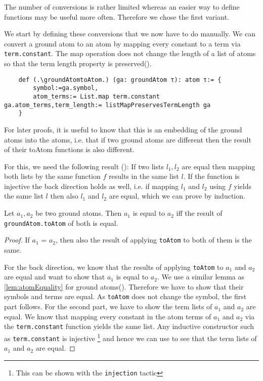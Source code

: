 The number of conversions is rather limited whereas an easier way to define functions may be useful more often. Therefore we chose the first variant. 

We start by defining these conversions that we now have to do manually. We can convert a ground atom to an atom by mapping every constant to a term via \lstinline|term.constant|. The map operation does not change the length of a list of atoms so that the term length property is preserved(\listMapPreservesTermLength).

\begin{lstlisting}
    def (.\groundAtomtoAtom.) (ga: groundAtom τ): atom τ:= {
        symbol:=ga.symbol, 
        atom_terms:= List.map term.constant ga.atom_terms,term_length:= listMapPreservesTermLength ga
    }
\end{lstlisting}

For later proofs, it is useful to know that this is an embedding of the ground atoms into the atoms, i.e. that if two ground atoms are different then the result of their toAtom functions is also different.

For this, we need the following result (\listMapInjectiveEquality): If two lists $l_1, l_2$ are equal then mapping both lists by the same function $f$ results in the same list $l$. If the function is injective the back direction holds as well, i.e. if mapping $l_1$ and $l_2$ using $f$ yields the same list $l$ then also $l_1$ and $l_2$ are equal,  which we can prove by induction.

\begin{lemma}[\groundAtomToAtomEquality]
    Let $a_1, a_2$ be two ground atoms. Then $a_1$ is equal to $a_2$ iff the result of \lstinline|groundAtom.toAtom| of both is equal.
\end{lemma}
\begin{proof}
    If $a_1$ = $a_2$, then also the result of applying \lstinline|toAtom| to both of them is the same.

    For the back direction, we know that the results of applying \lstinline|toAtom| to $a_1$ and $a_2$ are equal and want to show that $a_1$ is equal to $a_2$. We use a similar lemma as \cref{lem:atomEquality} for ground atoms(\groundAtomEquality). Therefore we have to show that their symbols and terms are equal. As \lstinline|toAtom| does not change the symbol, the first part follows. For the second part, we have to show the term lists of $a_1$ and $a_2$ are equal. We know that mapping every constant in the atom terms of $a_1$ and $a_2$  via the \lstinline|term.constant| function yields the same list. Any inductive constructor such as \lstinline|term.constant| is injective \footnote{This can be shown with the \lstinline|injection| tactic} and hence we can use \listMapInjectiveEquality to see that the term lists of $a_1$ and $a_2$ are equal.
\end{proof}

